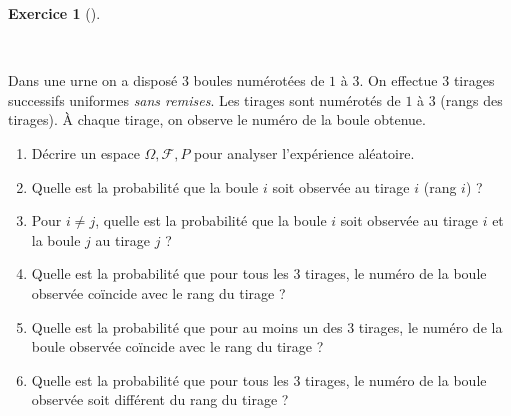 \documentclass[
  french,
  11pt,
  a4paper,
  twoside,
  article,
  titlepage=false]{memoir}
\providecommand{\tightlist}{%
  \setlength{\itemsep}{0pt}\setlength{\parskip}{0pt}}
\theoremstyle{definition}
\newtheorem{exercise}{Exercice}[section]
\theoremstyle{remark}
\begin{document}
\newpage{}

\begin{exercise}[]\protect\hypertarget{exr-6-a}{}\label{exr-6-a}

~

\end{exercise}

Dans une urne on a disposé \(3\) boules numérotées de \(1\) à \(3\). On
effectue \(3\) tirages successifs uniformes \emph{sans remises}. Les
tirages sont numérotés de \(1\) à \(3\) (rangs des tirages). À chaque
tirage, on observe le numéro de la boule obtenue.

\begin{enumerate}
\def\labelenumi{\roman{enumi}.}
\tightlist
\item
  Décrire un espace \(\Omega, \mathcal{F}, P\) pour analyser
  l'expérience aléatoire.
\item
  Quelle est la probabilité que la boule \(i\) soit observée au tirage
  \(i\) (rang \(i\)) ?
\item
  Pour \(i \neq j\), quelle est la probabilité que la boule \(i\) soit
  observée au tirage \(i\) et la boule \(j\) au tirage \(j\) ?
\item
  Quelle est la probabilité que pour tous les \(3\) tirages, le numéro
  de la boule observée coïncide avec le rang du tirage ?
\item
  Quelle est la probabilité que pour au moins un des \(3\) tirages, le
  numéro de la boule observée coïncide avec le rang du tirage ?
\item
  Quelle est la probabilité que pour tous les \(3\) tirages, le numéro
  de la boule observée soit différent du rang du tirage ?
\end{enumerate}


\backmatter
\end{document}
